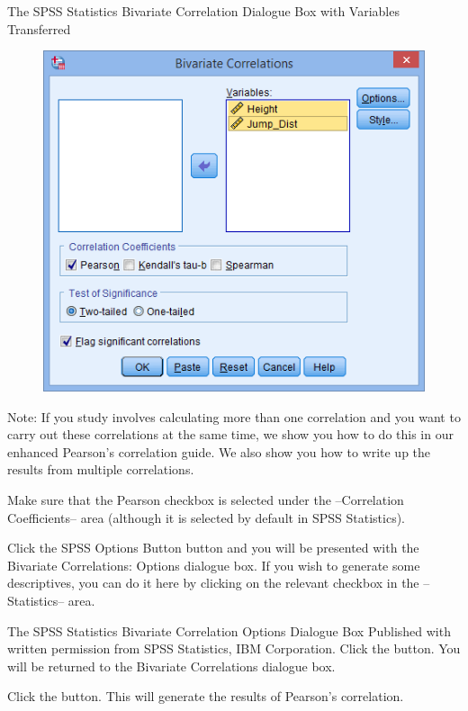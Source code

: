 \documentclass[]{article}
\begin{document}
The SPSS Statistics Bivariate Correlation Dialogue Box with Variables Transferred
\begin{figure}
	\centering
	\includegraphics[width=0.7\linewidth]{images/pearsons-correlation-transferred}
	\caption{}
	\label{fig:pearsons-correlation-transferred}
\end{figure}

Note: If you study involves calculating more than one correlation and you want to carry out these correlations at the same time, we show you how to do this in our enhanced Pearson’s correlation guide. We also show you how to write up the results from multiple correlations.

Make sure that the Pearson checkbox is selected under the –Correlation Coefficients– area (although it is selected by default in SPSS Statistics).

Click the SPSS Options Button button and you will be presented with the Bivariate Correlations: Options dialogue box. If you wish to generate some descriptives, you can do it here by clicking on the relevant checkbox in the –Statistics– area.

The SPSS Statistics Bivariate Correlation Options Dialogue Box
Published with written permission from SPSS Statistics, IBM Corporation.
Click the  button. You will be returned to the Bivariate Correlations dialogue box.

Click the  button. This will generate the results of Pearson's correlation.

\end{document}
